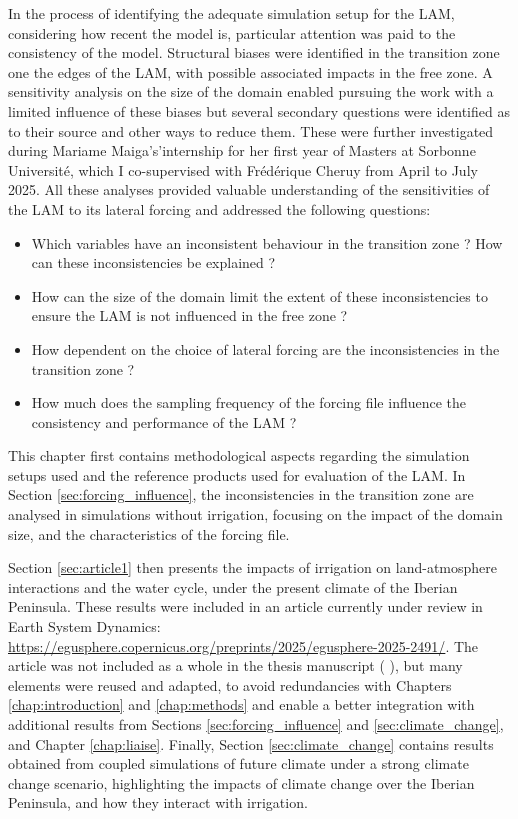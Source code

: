 In the process of identifying the adequate simulation setup for the LAM, considering how recent the model is, particular attention was paid to the consistency of the model. Structural biases were identified in the transition zone one the edges of the LAM, with possible associated impacts in the free zone. A sensitivity analysis on the size of the domain enabled pursuing the work with a limited influence of these biases but several secondary questions were identified as to their source and other ways to reduce them. These were further investigated during Mariame Maiga's'internship for her first year of Masters at Sorbonne Université, which I co-supervised with Frédérique Cheruy from April to July 2025. 
All these analyses provided valuable understanding of the sensitivities of the LAM to its lateral forcing and addressed the following questions: 
\begin{itemize}
    \item Which variables have an inconsistent behaviour in the transition zone ? How can these inconsistencies be explained ?
    \item How can the size of the domain limit the extent of these inconsistencies to ensure the LAM is not influenced in the free zone ?
    \item How dependent on the choice of lateral forcing are the inconsistencies in the transition zone ? 
    \item How much does the sampling frequency of the forcing file influence the consistency and performance of the LAM ?
\end{itemize}

This chapter first contains methodological aspects regarding the simulation setups used and the reference products used for evaluation of the LAM. 
In Section \ref{sec:forcing_influence}, the inconsistencies in the transition zone are analysed in simulations without irrigation, focusing on the impact of the domain size, and the characteristics of the forcing file.

Section \ref{sec:article1} then presents the impacts of irrigation on land-atmosphere interactions and the water cycle, under the present climate of the Iberian Peninsula. These results were included in an article currently under review in Earth System Dynamics: \url{https://egusphere.copernicus.org/preprints/2025/egusphere-2025-2491/}.
The article was not included as a whole in the thesis manuscript (%
), but many elements were reused and adapted, to avoid redundancies with Chapters \ref{chap:introduction} and \ref{chap:methods} and enable a better integration with additional results from Sections \ref{sec:forcing_influence} and \ref{sec:climate_change}, and Chapter \ref{chap:liaise}.
Finally, Section \ref{sec:climate_change} contains results obtained from coupled simulations of future climate under a strong climate change scenario, highlighting the impacts of climate change over the Iberian Peninsula, and how they interact with irrigation.

